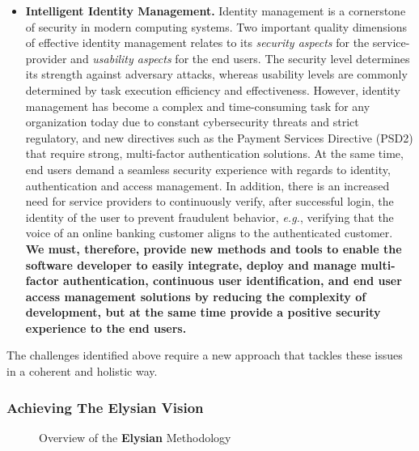 \documentclass[a4paper,11pt]{article}
\newcommand{\project}[1]{\textbf{#1}\xspace}
\newcommand{\SECURITY}{\project{Elysian}}
\newcommand{\TheProject}{\SECURITY}
\begin{document}
\begin{itemize}
\item \textbf{Intelligent Identity Management.} 
Identity management is a cornerstone of security in modern computing systems. Two important quality dimensions of effective identity management relates to its \textit{security aspects} for the service-provider and \textit{usability aspects} for the end users. The security level determines its strength against adversary attacks, whereas usability levels are commonly determined by task execution efficiency and effectiveness. However, identity management has become a complex and time-consuming task for any organization today due to constant cybersecurity threats and strict regulatory, and new directives such as the Payment Services Directive (PSD2) that require strong, multi-factor authentication solutions. At the same time, end users demand a seamless security experience with regards to identity, authentication and access management. In addition, there is an increased need for service providers to continuously verify, after successful login, the identity of the user to prevent fraudulent behavior, \textit{e.g.}, verifying that the voice of an online banking customer aligns to the authenticated customer. \textbf{We must, therefore, provide new methods and tools to enable the software developer to easily integrate, deploy and manage multi-factor authentication, continuous user identification, and end user access management solutions by reducing the complexity of development, but at the same time provide a positive security experience to the end users.}

\end{itemize}


The challenges identified above require a new approach that tackles these issues in a coherent and
holistic way. 

\subsubsection{Achieving The \TheProject{} Vision}
\label{sect:elysian_vision}

\begin{figure}[tph!]
  \begin{center}
  \vspace{-5mm}
  \caption{Overview of the \TheProject{} Methodology}
  \label{fig:overview}
  \end{center}
  \end{figure}
\end{document}
